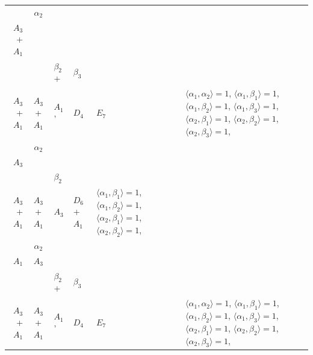 \documentclass[12pt]{report}
\begin{document}
\begin{appendix}
{\begin{longtable}{rcl p{1cm}p{1cm}p{3cm} }
\begin{tabular}{cc}$\alpha_1$+ & $\alpha_2$\\\tiny{ $A_3$+$A_1$ } & \tiny{  }\end{tabular} &\begin{tabular}{c} = \\~ \end{tabular} & \begin{tabular}{ccc}$\beta_1$+ & $\beta_2$+ & $\beta_3$\\\tiny{ $A_3$+$A_1$ } & \tiny{ $A_3$+$A_1$ } & \tiny{ $A_1$' }\end{tabular} & $D_4$ & $E_7$ & $\langle\alpha_1, \alpha_2\rangle=1$,  $\langle\alpha_1, \beta_1\rangle=1$, $\langle\alpha_1, \beta_2\rangle=1$, $\langle\alpha_1, \beta_3\rangle=1$, $\langle\alpha_2, \beta_1\rangle=1$, $\langle\alpha_2, \beta_2\rangle=1$, $\langle\alpha_2, \beta_3\rangle=1$, 
\\
\begin{tabular}{cc}$\alpha_1$+ & $\alpha_2$\\\tiny{ $A_3$ } & \tiny{  }\end{tabular} &\begin{tabular}{c} = \\~ \end{tabular} & \begin{tabular}{cc}$\beta_1$+ & $\beta_2$\\\tiny{ $A_3$+$A_1$ } & \tiny{ $A_3$+$A_1$ }\end{tabular} & $A_3$ & $D_6$+$A_1$ &  $\langle\alpha_1, \beta_1\rangle=1$, $\langle\alpha_1, \beta_2\rangle=1$, $\langle\alpha_2, \beta_1\rangle=1$, $\langle\alpha_2, \beta_2\rangle=1$, 
\\
\begin{tabular}{cc}$\alpha_1$+ & $\alpha_2$\\\tiny{ $A_1$ } & \tiny{ $A_3$ }\end{tabular} &\begin{tabular}{c} = \\~ \end{tabular} & \begin{tabular}{ccc}$\beta_1$+ & $\beta_2$+ & $\beta_3$\\\tiny{ $A_3$+$A_1$ } & \tiny{ $A_3$+$A_1$ } & \tiny{ $A_1$' }\end{tabular} & $D_4$ & $E_7$ & $\langle\alpha_1, \alpha_2\rangle=1$,  $\langle\alpha_1, \beta_1\rangle=1$, $\langle\alpha_1, \beta_2\rangle=1$, $\langle\alpha_1, \beta_3\rangle=1$, $\langle\alpha_2, \beta_1\rangle=1$, $\langle\alpha_2, \beta_2\rangle=1$, $\langle\alpha_2, \beta_3\rangle=1$, 

\end{longtable}}
\end{appendix}
\end{document}
